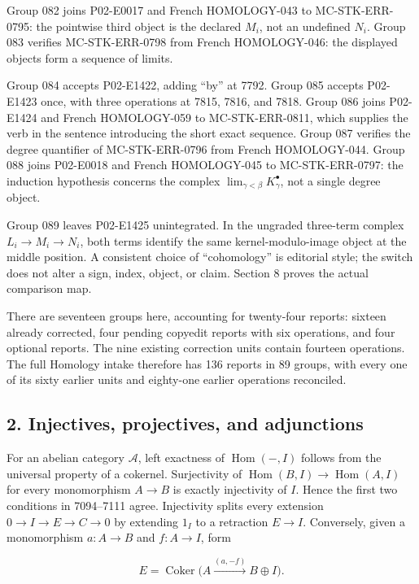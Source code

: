 Group 082 joins P02-E0017 and French HOMOLOGY-043 to MC-STK-ERR-0795: the pointwise third object is the declared \(M_i\), not an undefined \(N_i\). Group 083 verifies MC-STK-ERR-0798 from French HOMOLOGY-046: the displayed objects form a sequence of limits.

Group 084 accepts P02-E1422, adding ``by'' at 7792. Group 085 accepts P02-E1423 once, with three operations at 7815, 7816, and 7818. Group 086 joins P02-E1424 and French HOMOLOGY-059 to MC-STK-ERR-0811, which supplies the verb in the sentence introducing the short exact sequence. Group 087 verifies the degree quantifier of MC-STK-ERR-0796 from French HOMOLOGY-044. Group 088 joins P02-E0018 and French HOMOLOGY-045 to MC-STK-ERR-0797: the induction hypothesis concerns the complex \(\lim_{\gamma<\beta}K_\gamma^\bullet\), not a single degree object.

Group 089 leaves P02-E1425 unintegrated. In the ungraded three-term complex \(L_i\to M_i\to N_i\), both terms identify the same kernel-modulo-image object at the middle position. A consistent choice of ``cohomology'' is editorial style; the switch does not alter a sign, index, object, or claim. Section 8 proves the actual comparison map.

There are seventeen groups here, accounting for twenty-four reports: sixteen already corrected, four pending copyedit reports with six operations, and four optional reports. The nine existing correction units contain fourteen operations. The full Homology intake therefore has 136 reports in 89 groups, with every one of its sixty earlier units and eighty-one earlier operations reconciled.

\subsection{2. Injectives, projectives, and adjunctions}\label{note-09-injectives-projectives-and-adjunctions}

For an abelian category \(\mathcal A\), left exactness of \(\operatorname{Hom}(-,I)\) follows from the universal property of a cokernel. Surjectivity of \(\operatorname{Hom}(B,I)\to\operatorname{Hom}(A,I)\) for every monomorphism \(A\to B\) is exactly injectivity of \(I\). Hence the first two conditions in 7094--7111 agree. Injectivity splits every extension \(0\to I\to E\to C\to0\) by extending \(1_I\) to a retraction \(E\to I\). Conversely, given a monomorphism \(a:A\to B\) and \(f:A\to I\), form

\[
E=\operatorname{Coker}\bigl(A\xrightarrow{(a,-f)}B\oplus I\bigr).
\]

